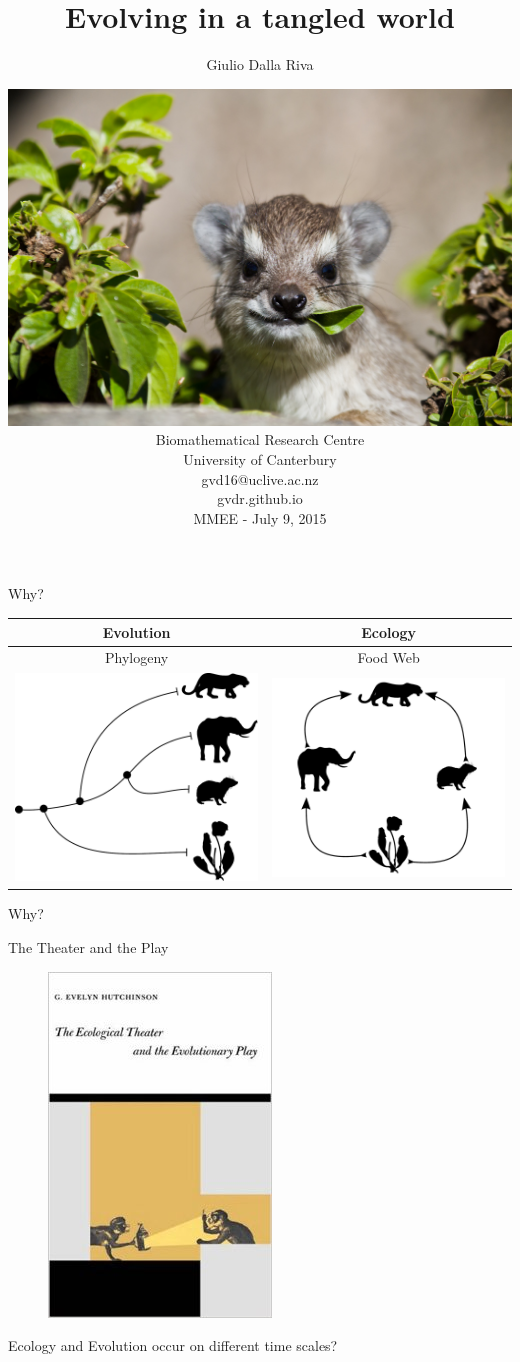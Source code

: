 \documentclass[]{beamer}
\title{Evolving in a tangled world}
\author{Giulio Dalla Riva}
\date{ \includegraphics[width=0.4\linewidth]{images/hyraxchew.jpg}\\
  {\tiny Biomathematical Research Centre\\
  University of Canterbury\\
  gvd16@uclive.ac.nz\\
  gvdr.github.io\\}
MMEE - July 9, 2015}
\begin{document}
\frame{\titlepage
\addtocounter{framenumber}{-1}}

\begin{frame}{Why?}

\centering
\begin{tabular}{|c|c|}\hline
Evolution & Ecology \\\hline\hline
Phylogeny & Food Web \\
\includegraphics[width=0.4 \textwidth]{images/small_phylo.pdf} & \includegraphics[width=0.4 \textwidth]{images/small_fw.pdf} \\ \hline
\end{tabular}

\end{frame}

\begin{frame}{Why?}

\centering
The Theater and the Play

\begin{figure}
\centering
\includegraphics[height=0.5 \textheight]{images/hutchinson_ecotheatreevoplay.jpg}
\end{figure}
\centering
{\tiny Ecology and Evolution occur on different time scales?}

\end{frame}
\end{document}
